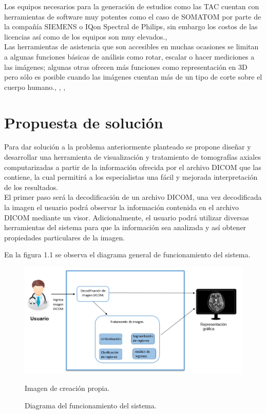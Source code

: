 \documentclass[12pt]{report}
\begin{document}
Los equipos necesarios para la generación de estudios como las TAC cuentan con herramientas de software muy potentes como el caso de SOMATOM por parte de la compañía SIEMENS o IQon Spectral de Philips, sin embargo los costos de las licencias así como de los equipos son muy elevados.\cite{guia}, \cite{guiad}\\

Las herramientas de asistencia que son accesibles en muchas ocasiones se limitan a algunas funciones básicas de análisis como rotar, escalar o hacer mediciones a las imágenes; algunas otras ofrecen más funciones como representación en 3D pero sólo es posible cuando las imágenes  cuentan más de un tipo de corte sobre el cuerpo humano.\cite{occi}, \cite{nifty}, \cite{osirix}, \cite{3dim}\\

\section{Propuesta de solución}
Para dar solución a la problema anteriormente planteado se propone diseñar y desarrollar una herramienta de visualización y tratamiento de tomografías axiales computarizadas a partir de la información ofrecida por el archivo DICOM que las contiene, la cual permitirá a los especialistas una fácil y mejorada interpretación de  los resultados.\\

El primer paso será la decodificación de un archivo DICOM, una vez decodificada la imagen el usuario podrá observar la información contenida en el archivo DICOM mediante un visor. Adicionalmente, el usuario podrá utilizar diversas herramientas del sistema para que la información sea analizada y así obtener propiedades particulares de la imagen.

En la figura 1.1 se observa el diagrama general de funcionamiento del sistema.
\begin{figure}[H]
\centering
\includegraphics[width = 12 cm, height = 7 cm]{diagramageneral}
\caption{Diagrama del funcionamiento del sistema.}
Imagen de creación propia.
\end{figure}
\end{document}
